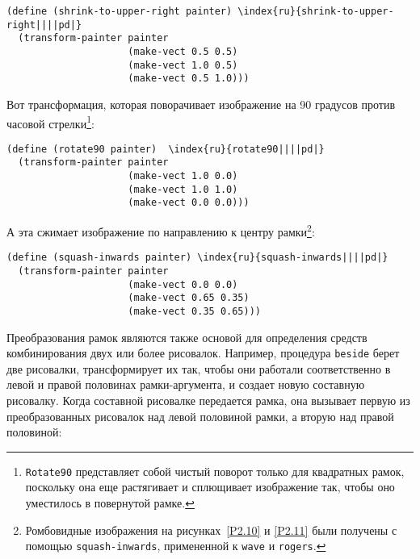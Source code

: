 \begin{Verbatim}[fontsize=\small]
(define (shrink-to-upper-right painter) \index{ru}{shrink-to-upper-right||||pd|}
  (transform-painter painter
                     (make-vect 0.5 0.5)
                     (make-vect 1.0 0.5)
                     (make-vect 0.5 1.0)))
\end{Verbatim}
Вот трансформация, которая поворачивает изображение
на 90 градусов против часовой стрелки\footnote{{\tt Rotate90} представляет собой чистый
поворот только для квадратных рамок, поскольку она еще растягивает и
сплющивает изображение так, чтобы оно уместилось в повернутой рамке.}:

\begin{Verbatim}[fontsize=\small]
(define (rotate90 painter)  \index{ru}{rotate90||||pd|}
  (transform-painter painter
                     (make-vect 1.0 0.0)
                     (make-vect 1.0 1.0)
                     (make-vect 0.0 0.0)))
\end{Verbatim}
А эта сжимает изображение по направлению к центру рамки\footnote{Ромбовидные изображения на рисунках~\ref{P2.10} и \ref{P2.11} были
получены с помощью {\tt squash-inwards}, примененной к
{\tt wave} и {\tt rogers}.}:

\begin{Verbatim}[fontsize=\small]
(define (squash-inwards painter) \index{ru}{squash-inwards||||pd|}
  (transform-painter painter
                     (make-vect 0.0 0.0)
                     (make-vect 0.65 0.35)
                     (make-vect 0.35 0.65)))
\end{Verbatim}

Преобразования рамок являются также основой для
определения средств комбинирования двух или более рисовалок.
Например, процедура {\tt beside} берет две рисовалки,
трансформирует их так, чтобы они работали соответственно в левой и
правой половинах рамки-аргумента, и создает новую составную
рисовалку.  Когда составной рисовалке передается рамка, она вызывает
первую из преобразованных рисовалок над левой половиной рамки, а
вторую над правой половиной:

